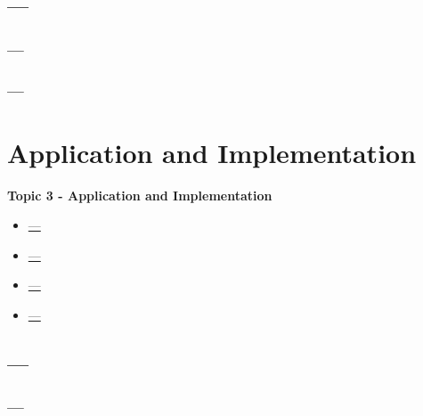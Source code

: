 \documentclass[fleqn]{beamer} %
\newcommand{\sectionIVtitle}{Application and Implementation}
\newcommand{\sectionIIIsubsectionIVtitle}{---}
\newcommand{\sectionIVsubsectionItitle}{---}
\newcommand{\sectionIVsubsectionIItitle}{---}
\newcommand{\sectionIVsubsectionIIItitle}{---}
\newcommand{\sectionIVsubsectionIVtitle}{---}
\begin{document}
		\subsection{\sectionIIIsubsectionIVtitle}\label{sectionIIIsubsectionIV}	

			\begin{frame}[containsverbatim]
				\frametitle{\sectionIIIsubsectionIVtitle}
				\bigskip
				\btVFill 
			\end{frame}

			\begin{frame}
				\frametitle{\sectionIIIsubsectionIVtitle}
				\bigskip

		 		\btVFill 
			\end{frame}

	\section{\sectionIVtitle}\label{sectionIV}

		\begin{frame}
			\large \textbf{Topic 3 - \sectionIVtitle} \vspace{3mm}\\

			\begin{itemize}
				\item \hyperlink{sectionIVsubsectionI}{\sectionIVsubsectionItitle} \vspc %
				\item \hyperlink{sectionIVsubsectionII}{\sectionIVsubsectionIItitle} \vspc %
				\item \hyperlink{sectionIVsubsectionIII}{\sectionIVsubsectionIIItitle} \vspc %
				\item \hyperlink{sectionIVsubsectionIV}{\sectionIVsubsectionIVtitle} \vspc %

			\end{itemize}

		\end{frame}

		\subsection{\sectionIVsubsectionItitle}\label{sectionIVsubsectionI}

			\begin{frame}
				\frametitle{\sectionIVsubsectionItitle}
				\bigskip

				\btVFill
			\end{frame}
\end{document}
